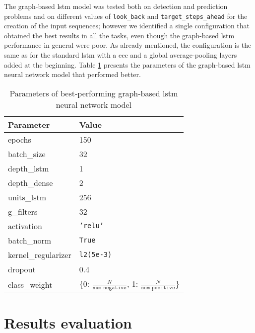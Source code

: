 The graph-based \acs{lstm} model was tested both on detection and prediction problems and on different values of \texttt{look\_back} and \texttt{target\_steps\_ahead} for the creation of the input sequences; however we identified a single configuration that obtained the best results in all the tasks, even though the graph-based \acs{lstm} performance in general were poor. As already mentioned, the configuration is the same as for the standard \acs{lstm} with a \acs{ecc} and a global average-pooling layers added at the beginning. Table \ref{tab:glstm_param} presents the parameters of the graph-based \acs{lstm} neural network model that performed better.
\begin{table}[htbp]
    \centering
    \begin{tabular}{ll}
        \hline
        \textbf{Parameter}  & \textbf{Value} \\\hline
        epochs              & 150 \\
        batch\_size         & 32 \\
        depth\_lstm         & 1 \\
        depth\_dense        & 2 \\
        units\_lstm         & 256 \\
        g\_filters          & 32 \\
        activation          & \texttt{'relu'} \\
        batch\_norm         & \texttt{True} \\
        kernel\_regularizer & \texttt{l2(5e-3)} \\
        dropout             & 0.4 \\
        class\_weight       & \{0: $\frac{N}{\texttt{num\_negative}}$, 1: $\frac{N}{\texttt{num\_positive}}$\} \\\hline
    \end{tabular}
    \caption{Parameters of best-performing graph-based \acs{lstm} neural network model}
    \label{tab:glstm_param}
\end{table}



\section{Results evaluation} \label{sec: results}

